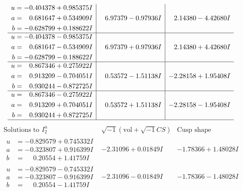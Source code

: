 \documentclass[1p]{elsarticle_modified}
\theoremstyle{definition}
\newcommand{\I}{\sqrt{-1}}
\begin{document}
$$\begin{array}{c|c|c}
\begin{aligned}
u &= -0.404378 + 0.985375 I \\
a &= \phantom{-}0.681647 + 0.534909 I \\
b &= -0.628799 + 0.188622 I\end{aligned}
 & \phantom{-}6.97379 - 0.97936 I & \phantom{-}2.14380 - 4.42680 I \\ \hline\begin{aligned}
u &= -0.404378 - 0.985375 I \\
a &= \phantom{-}0.681647 - 0.534909 I \\
b &= -0.628799 - 0.188622 I\end{aligned}
 & \phantom{-}6.97379 + 0.97936 I & \phantom{-}2.14380 + 4.42680 I \\ \hline\begin{aligned}
u &= \phantom{-}0.867346 + 0.275922 I \\
a &= \phantom{-}0.913209 - 0.704051 I \\
b &= \phantom{-}0.930244 - 0.872725 I\end{aligned}
 & \phantom{-}0.53572 - 1.51138 I & -2.28158 + 1.95408 I \\ \hline\begin{aligned}
u &= \phantom{-}0.867346 - 0.275922 I \\
a &= \phantom{-}0.913209 + 0.704051 I \\
b &= \phantom{-}0.930244 + 0.872725 I\end{aligned}
 & \phantom{-}0.53572 + 1.51138 I & -2.28158 - 1.95408 I\\
 \hline 
 \end{array}$$\newpage$$\begin{array}{c|c|c}  
\text{Solutions to }I^u_{2}& \I (\text{vol} + \sqrt{-1}CS) & \text{Cusp shape}\\
 \hline 
\begin{aligned}
u &= -0.829579 + 0.745332 I \\
a &= -0.323807 + 0.916399 I \\
b &= \phantom{-}0.20554 + 1.41759 I\end{aligned}
 & -2.31096 + 0.01849 I & -1.78366 + 1.48028 I \\ \hline\begin{aligned}
u &= -0.829579 - 0.745332 I \\
a &= -0.323807 - 0.916399 I \\
b &= \phantom{-}0.20554 - 1.41759 I\end{aligned}
 & -2.31096 - 0.01849 I & -1.78366 - 1.48028 I \\ \hline\begin{aligned}

\end{aligned}
\end{array}$$
\end{document}
